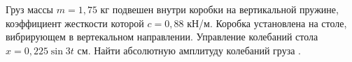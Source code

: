 Груз массы $m=1{,}75$ кг подвешен внутри коробки
на вертикальной пружине, 
коэффициент жесткости которой $c=0{,}88$ кН/м.
Коробка установлена на столе, вибрирующем в
 вертекальном направлении.
Управление колебаний стола $x=0{,}225 \sin 3t$ см.
Найти абсолютную амплитуду колебаний груза
.

